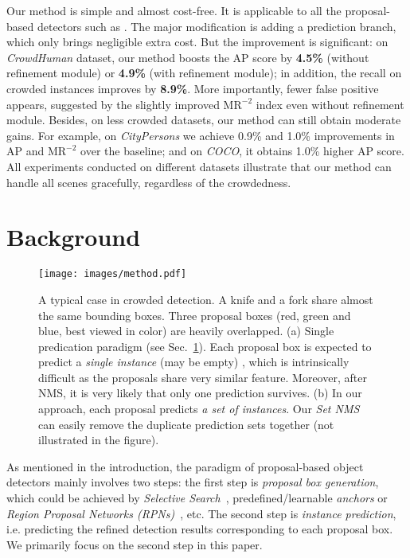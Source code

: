 \documentclass[10pt,twocolumn,letterpaper]{article}
\begin{document}
Our method is simple and almost cost-free. It is applicable to all the proposal-based detectors such as \cite{ren2015faster,lin2017feature,lin2017focal,he2017mask}. The major modification is adding a prediction branch, which only brings negligible extra cost. But the improvement is significant: on \emph{CrowdHuman} \cite{shao2018crowdhuman} dataset, our method boosts the AP score by \textbf{4.5\%} (without refinement module) or \textbf{4.9\%} (with refinement module); in addition, the recall on crowded instances improves by \textbf{8.9\%}. More importantly, fewer false positive appears, suggested by the slightly improved $\text{MR}^{-2}$ index even without refinement module. Besides, on less crowded datasets, our method can still obtain moderate gains. For example, on \emph{CityPersons} we achieve 0.9\% and 1.0\% improvements in AP and $\text{MR}^{-2}$ over the baseline; and on \emph{COCO}, \cite{lin2014microsoft} it obtains 1.0\% higher AP score. All experiments conducted on different datasets illustrate that our method can handle all scenes gracefully, regardless of the crowdedness.

\section{Background}
\label{sec:limitations}

\begin{figure}[t]
	\begin{center}
		\texttt{[image: images/method.pdf]}
	\end{center}
	\caption{A typical case in crowded detection. A knife and a fork share almost the same bounding boxes. Three proposal boxes (red, green and blue, best viewed in color) are heavily overlapped. (a) Single predication paradigm (see Sec.~\ref{sec:limitations}). Each proposal box is expected to predict a \emph{single instance} \cite{ren2015faster,lin2017feature,lin2017focal,liu2016ssd,yolov3,he2017mask} (may be empty) , which is intrinsically difficult as the proposals share very similar feature. Moreover, after NMS, it is very likely that only one prediction survives. (b) In our approach, each proposal predicts \emph{a set of instances}. Our \emph{Set NMS} can easily remove the duplicate prediction sets together (not illustrated in the figure).}
	\label{fig:method}
\end{figure}

As mentioned in the introduction, the paradigm of proposal-based object detectors mainly involves two steps: the first step is \emph{proposal box generation}, which could be achieved by \emph{Selective Search}~\cite{girshick2014rich,girshick2015fast}, predefined/learnable \emph{anchors} \cite{ren2015faster,yolov3,liu2016ssd,lin2017focal,yang2018metaanchor,wang2019region,zhong2019cascade} or \emph{Region Proposal Networks (RPNs)}~\cite{ren2015faster,lin2017feature,he2017mask,dai2016rfcn,cai2019cascadercnn}, etc. The second step is \emph{instance prediction}, i.e. predicting the refined detection results corresponding to each proposal box. We primarily focus on the second step in this paper.
\end{document}
